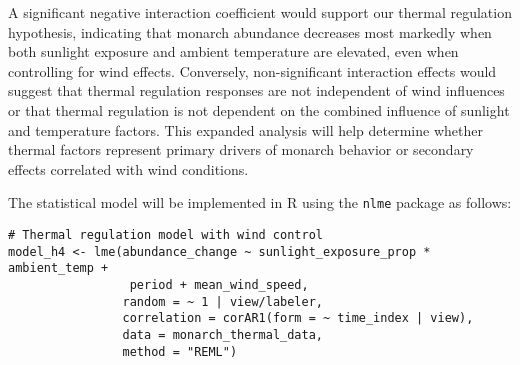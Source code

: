 A significant negative interaction coefficient would support our thermal regulation hypothesis, indicating that monarch abundance decreases most markedly when both sunlight exposure and ambient temperature are elevated, even when controlling for wind effects. Conversely, non-significant interaction effects would suggest that thermal regulation responses are not independent of wind influences or that thermal regulation is not dependent on the combined influence of sunlight and temperature factors. This expanded analysis will help determine whether thermal factors represent primary drivers of monarch behavior or secondary effects correlated with wind conditions.

The statistical model will be implemented in R using the \texttt{nlme} package as follows:

\begin{verbatim}
# Thermal regulation model with wind control
model_h4 <- lme(abundance_change ~ sunlight_exposure_prop * ambient_temp + 
                 period + mean_wind_speed,
                random = ~ 1 | view/labeler,
                correlation = corAR1(form = ~ time_index | view),
                data = monarch_thermal_data,
                method = "REML")
\end{verbatim}